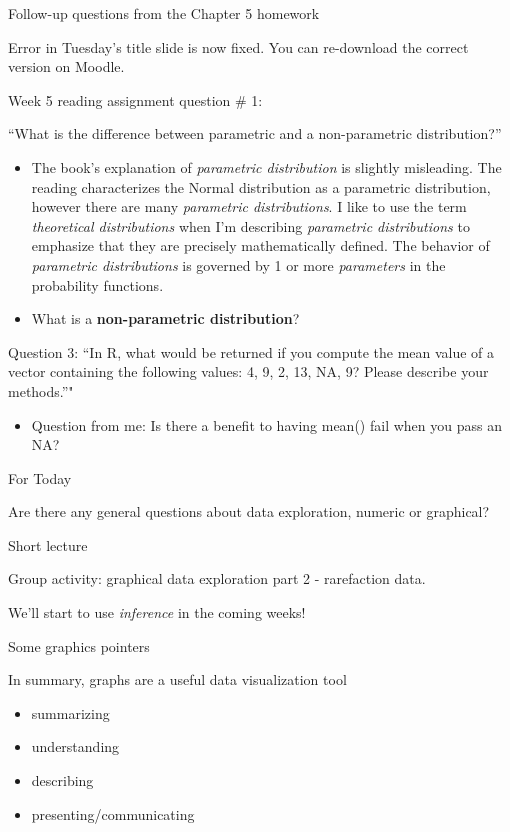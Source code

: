 \documentclass[ignorenonframetext,t]{beamer}
\providecommand{\tightlist}{%
  \setlength{\itemsep}{0pt}\setlength{\parskip}{0pt}}
\begin{document}
\begin{frame}{Follow-up questions from the Chapter 5 homework}

Error in Tuesday's title slide is now fixed. You can re-download the
correct version on Moodle.

Week 5 reading assignment question \# 1:

``What is the difference between parametric and a non-parametric
distribution?''

\begin{itemize}
\item
  The book's explanation of \emph{parametric distribution} is slightly
  misleading. The reading characterizes the Normal distribution as a
  parametric distribution, however there are many \emph{parametric
  distributions}. I like to use the term \emph{theoretical
  distributions} when I'm describing \emph{parametric distributions} to
  emphasize that they are precisely mathematically defined. The behavior
  of \emph{parametric distributions} is governed by 1 or more
  \emph{parameters} in the probability functions.
\item
  What is a \textbf{non-parametric distribution}?
\end{itemize}

Question 3: ``In R, what would be returned if you compute the mean value
of a vector containing the following values: 4, 9, 2, 13, NA, 9? Please
describe your methods.''"

\begin{itemize}
\tightlist
\item
  Question from me: Is there a benefit to having mean() fail when you
  pass an NA?
\end{itemize}

\end{frame}

\begin{frame}{For Today}

Are there any general questions about data exploration, numeric or
graphical?

Short lecture

Group activity: graphical data exploration part 2 - rarefaction data.

We'll start to use \emph{inference} in the coming weeks!

\end{frame}

\begin{frame}{Some graphics pointers}

In summary, graphs are a useful data visualization tool

\begin{itemize}
\tightlist
\item
  summarizing
\item
  understanding
\item
  describing
\item
  presenting/communicating
\end{itemize}

\end{frame}
\end{document}
